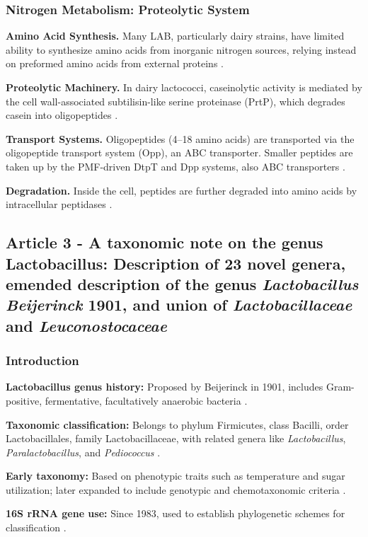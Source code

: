 \subsubsection{Nitrogen Metabolism: Proteolytic System}
\textbf{Amino Acid Synthesis.} Many LAB, particularly dairy strains, have limited ability to synthesize amino acids from inorganic nitrogen sources, relying instead on preformed amino acids from external proteins \cite*{L3-LAB}.

\textbf{Proteolytic Machinery.} In dairy lactococci, caseinolytic activity is mediated by the cell wall-associated subtilisin-like serine proteinase (PrtP), which degrades casein into oligopeptides \cite*{L3-LAB}.

\textbf{Transport Systems.} Oligopeptides (4–18 amino acids) are transported via the oligopeptide transport system (Opp), an ABC transporter. Smaller peptides are taken up by the PMF-driven DtpT and Dpp systems, also ABC transporters \cite*{L3-LAB}.

\textbf{Degradation.} Inside the cell, peptides are further degraded into amino acids by intracellular peptidases \cite*{L3-LAB}.

\subsection{Article 3 - A taxonomic note on the genus Lactobacillus: Description of 23 novel genera, emended description of the genus \textit{Lactobacillus Beijerinck} 1901, and union of \textit{Lactobacillaceae} and \textit{Leuconostocaceae}}
\subsubsection*{Introduction}

\textbf{Lactobacillus genus history:} Proposed by Beijerinck in 1901, includes Gram-positive, fermentative, facultatively anaerobic bacteria \cite*{L3-TaxNotes}.

\textbf{Taxonomic classification:} Belongs to phylum Firmicutes, class Bacilli, order Lactobacillales, family Lactobacillaceae, with related genera like \textit{Lactobacillus}, \textit{Paralactobacillus}, and \textit{Pediococcus} \cite*{L3-TaxNotes}.

\textbf{Early taxonomy:} Based on phenotypic traits such as temperature and sugar utilization; later expanded to include genotypic and chemotaxonomic criteria \cite*{L3-TaxNotes}.

\textbf{16S rRNA gene use:} Since 1983, used to establish phylogenetic schemes for classification \cite*{L3-TaxNotes}.

